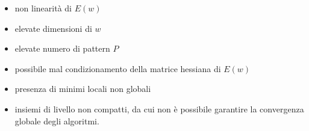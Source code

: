 \begin{itemize}
  \item non linearità di $E(w)$
  \item elevate dimensioni di $w$
  \item elevate numero di pattern $P$
  \item possibile mal condizionamento della matrice hessiana di $E(w)$
  \item presenza di minimi locali non globali
  \item insiemi di livello non compatti, da cui non è possibile garantire la convergenza globale degli algoritmi.
\end{itemize}
